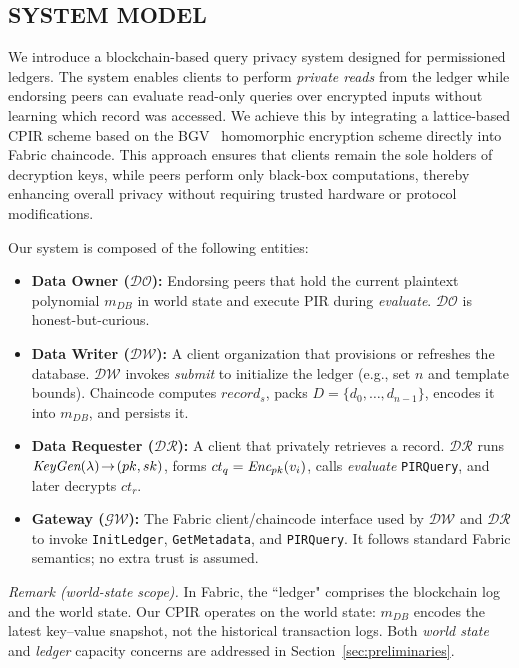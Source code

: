\documentclass{ieeetj}
\begin{document}
\subsection{SYSTEM MODEL}
We introduce a blockchain-based query privacy system designed for permissioned ledgers. 
The system enables clients to perform \emph{private reads} from the ledger while endorsing peers can evaluate 
read-only queries over encrypted inputs without learning which record was accessed.  
We achieve this by integrating a lattice-based CPIR scheme based on the
BGV~\cite{cryptoeprint:2011/277} homomorphic encryption scheme directly into Fabric chaincode.
This approach ensures that clients remain the sole holders of decryption keys, while peers perform only 
black-box computations, thereby enhancing overall privacy without requiring trusted hardware or protocol modifications.

\noindent Our system is composed of the following entities:

\begin{itemize}
    \item \textbf{Data Owner ($\mathcal{DO}$):} Endorsing peers that hold the current plaintext 
    polynomial \emph{$m_{DB}$} in world state and execute PIR during \emph{evaluate}. $\mathcal{DO}$ is honest-but-curious.
    \item \textbf{Data Writer ($\mathcal{DW}$):} A client organization that provisions or refreshes 
    the database. $\mathcal{DW}$ invokes \emph{submit} to initialize the ledger (e.g., set $n$ and template bounds). 
    Chaincode computes $record_s$, packs $D=\{d_0,\dots,d_{n-1}\}$, encodes it into \emph{$m_{DB}$}, and persists it.
    \item \textbf{Data Requester ($\mathcal{DR}$):} A client that privately retrieves a record. $\mathcal{DR}$ 
    runs $\emph{KeyGen}(\lambda)\!\to\!(pk,sk)$, forms $ct_q=\emph{Enc}_{pk}(v_i)$, calls \emph{evaluate} \texttt{PIRQuery}, and later decrypts $ct_r$.
    \item \textbf{Gateway ($\mathcal{GW}$):} The Fabric client/chaincode interface used by $\mathcal{DW}$ 
    and $\mathcal{DR}$ to invoke \texttt{InitLedger}, \texttt{GetMetadata}, and \texttt{PIRQuery}. It follows standard Fabric semantics; no extra trust is assumed.
\end{itemize}

\noindent\textit{Remark (world-state scope).} In Fabric, the ``ledger" comprises the blockchain log and the world state. 
Our CPIR operates on the world state: \emph{$m_{DB}$} encodes the latest key--value snapshot, not the historical transaction logs.
Both \emph{world state} and \emph{ledger} capacity concerns are addressed in Section~\ref{sec:preliminaries}.
\end{document}
